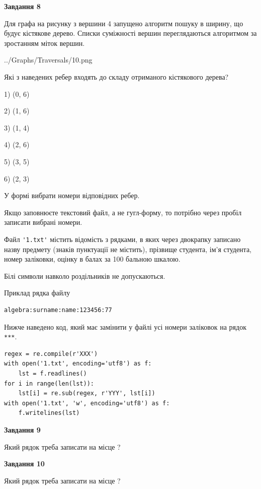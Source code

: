 \documentclass[12pt, ukrainian]{article}
\def\code#1{\Verb!#1!}
\begin{document}
{\begin {large}
{\begin {center}\textbf{Завдання 8}\end {center}}\par
Для графа на рисунку з вершини 4 запущено алгоритм пошуку в ширину, що будує кістякове дерево. Списки суміжності вершин переглядаються алгоритмом за зростанням міток вершин.\par
\begin{center}
	{../Graphs/Traversals/10.png}
\end{center}
\par Які з наведених ребер входять до складу отриманого кістякового дерева?\par
1) (0, 6)\par
2) (1, 6)\par
3) (1, 4)\par
4) (2, 6)\par
5) (3, 5)\par
6) (2, 3)\par
{\vskip 15pt} У формі вибрати номери відповідних ребер.


Якщо заповнюєте текстовий файл, а не гугл-форму, то потрібно через пробіл записа\-ти вибрані номери.\par
\newpage


Файл \code{'1.txt'} містить відомість з рядками, в яких через двокрапку записа\-но назву предмету (знаків пунктуації не містить), прізвище студента, ім'я студента, номер залі\-ков\-ки, оцінку в балах за 100 бальною шкалою.

Білі символи навколо роздільників не допускаються.

Приклад рядка файлу



\begin{verbatim}
algebra:surname:name:123456:77
\end{verbatim}


Нижче наведено код, який має замінити у файлі усі номери заліковок на рядок \code{***}.



\begin{verbatim}
regex = re.compile(r'XXX')
with open('1.txt', encoding='utf8') as f:
    lst = f.readlines()
for i in range(len(lst)):
    lst[i] = re.sub(regex, r'YYY', lst[i])
with open('1.txt', 'w', encoding='utf8') as f:
    f.writelines(lst)
\end{verbatim}




{\begin {center}\textbf{Завдання 9}\end {center}}\par
Який рядок треба записати на місце  ?\par
\vspace{5mm}


{\begin {center}\textbf{Завдання 10}\end {center}}\par
Який рядок треба записати на місце  ?\par


\newpage


\end {large}}
\end{document}
